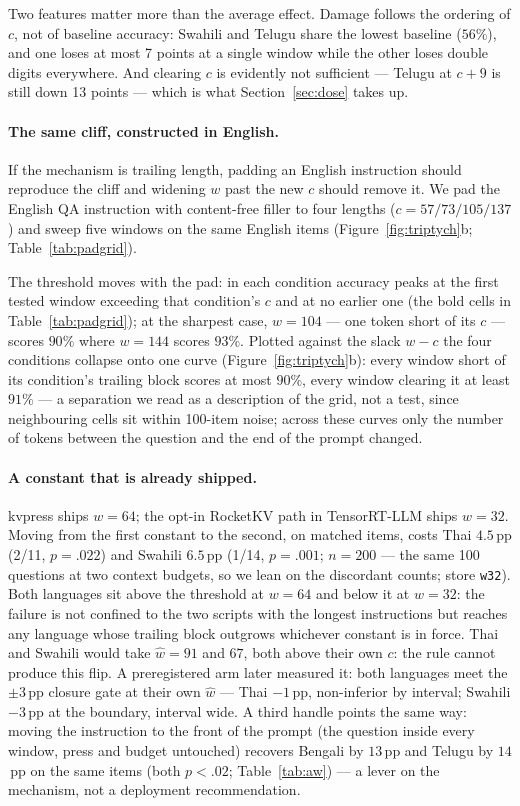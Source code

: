 \documentclass{article}
\begin{document}
Two features matter more than the average effect. Damage follows the
ordering of $c$, not of baseline accuracy: Swahili and Telugu share the
lowest baseline ($56\%$), and one loses at most 7 points at a single
window while the other loses double digits everywhere. And clearing $c$
is evidently not sufficient --- Telugu at $c{+}9$ is still down 13
points --- which is what Section~\ref{sec:dose} takes up.

\paragraph{The same cliff, constructed in English.}
If the mechanism is trailing length, padding an English instruction
should reproduce the cliff and widening $w$ past the new $c$ should
remove it. We pad the English QA instruction with content-free filler to four
lengths ($c = 57/73/105/137$) and sweep five windows on the same
English items (Figure~\ref{fig:triptych}b; Table~\ref{tab:padgrid}).

The threshold moves with the pad: in each condition accuracy peaks
at the first tested window exceeding that condition's $c$ and at no
earlier one (the bold cells in Table~\ref{tab:padgrid}); at the
sharpest case, $w{=}104$ --- one token short of its $c$ --- scores
$90\%$ where $w{=}144$ scores $93\%$. Plotted against the slack $w-c$ the
four conditions collapse onto one curve (Figure~\ref{fig:triptych}b):
every window short of its condition's trailing block scores at most
$90\%$, every window clearing it at least $91\%$ --- a separation
we read as a description of the grid, not a test, since neighbouring
cells sit within 100-item noise; across these curves only the number
of tokens between the question and the end of the prompt changed.
\paragraph{A constant that is already shipped.}
kvpress ships $w{=}64$; the opt-in RocketKV path in TensorRT-LLM ships
$w{=}32$. Moving from the first constant to the second, on matched items,
costs Thai $4.5$\,pp (2/11, $p{=}.022$) and Swahili $6.5$\,pp
(1/14, $p{=}.001$; $n{=}200$ --- the same 100 questions at two context
budgets, so we lean on the discordant counts; store \texttt{w32}). Both languages sit above the
threshold at $w{=}64$ and below it at $w{=}32$: the failure is not
confined to the two scripts with the longest instructions but reaches
any language whose trailing block outgrows whichever constant is in
force.
Thai and Swahili would take $\hat w = 91$ and $67$, both above their own
$c$: the rule cannot produce this flip. A preregistered arm later
measured it: both languages meet the $\pm 3$\,pp closure gate at their
own $\hat w$ --- Thai $-1$\,pp, non-inferior by interval; Swahili
$-3$\,pp at the boundary, interval wide.
A third handle points the same way: moving the instruction to the
front of the prompt (the question inside every window, press and
budget untouched) recovers Bengali by $13$\,pp and Telugu by
$14$\,pp on the same items (both $p{<}.02$; Table~\ref{tab:aw}) ---
a lever on the mechanism, not a deployment recommendation.
\end{document}
